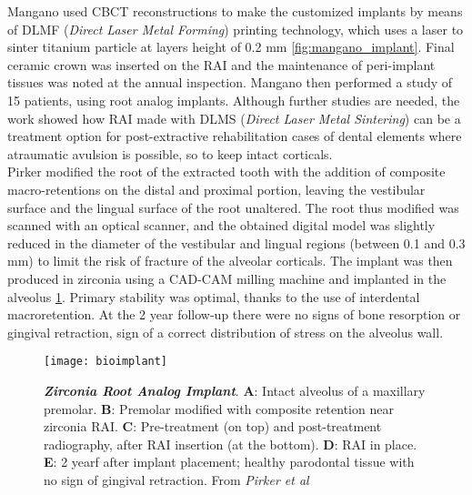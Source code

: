 Mangano \parencite{Reference84} used CBCT reconstructions to make the customized implants by means of DLMF (\emph{Direct Laser Metal Forming}) printing technology, which uses a laser to sinter titanium particle at layers height of 0.2 mm \ref{fig:mangano_implant}. Final ceramic crown was inserted on the RAI and the maintenance of peri-implant tissues was noted at the annual inspection.
Mangano \parencite{Reference85} then performed a study of 15 patients, using root analog implants. Although further studies are needed, the work showed how RAI made with DLMS (\emph{Direct Laser Metal Sintering}) can be a treatment option for post-extractive rehabilitation cases of dental elements where atraumatic avulsion is possible, so to keep intact corticals. \\
Pirker \parencite{Reference86} modified the root of the extracted tooth with the addition of composite macro-retentions on the distal and proximal portion, leaving the vestibular surface and the lingual surface of the root unaltered. The root thus modified was scanned with an optical scanner, and the obtained digital model was slightly reduced in the diameter of the vestibular and lingual regions (between 0.1 and 0.3 mm) to limit the risk of fracture of the alveolar corticals. The implant was then produced in zirconia using a CAD-CAM milling machine and implanted in the alveolus \ref{fig:bioimplant}. Primary stability was optimal, thanks to the use of interdental macroretention. At the 2 year follow-up there were no signs of bone resorption or gingival retraction, sign of a correct distribution of stress on the alveolus wall.
\begin{figure}[h]
\vspace{-10pt}
	\begin{center}
	\texttt{[image: bioimplant]}
    \caption{\textbf{\textit{Zirconia Root Analog Implant}}. \textbf{A}: Intact alveolus of a maxillary premolar. \textbf{B}: Premolar modified with composite retention near zirconia RAI. \textbf{C}: Pre-treatment (on top) and post-treatment radiography, after RAI insertion (at the bottom). \textbf{D}: RAI in place. \textbf{E}: 2 yearf after implant placement; healthy parodontal tissue with no sign of gingival retraction. From \emph{Pirker et al} \parencite{Reference86}}
    \label{fig:bioimplant}
    \end{center}
\vspace{-10pt}
\end{figure}

